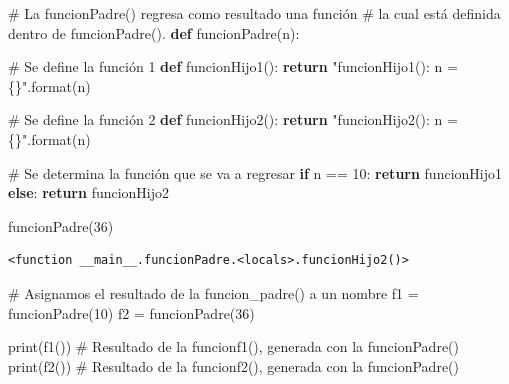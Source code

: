 \documentclass[
  spanish,
  letterpaper,
]{scrbook}
\newenvironment{Shaded}{\begin{snugshade}}{\end{snugshade}}
\newcommand{\BuiltInTok}[1]{\textcolor[rgb]{0.00,0.23,0.31}{#1}}
\newcommand{\CommentTok}[1]{\textcolor[rgb]{0.37,0.37,0.37}{#1}}
\newcommand{\ControlFlowTok}[1]{\textcolor[rgb]{0.00,0.23,0.31}{\textbf{#1}}}
\newcommand{\DecValTok}[1]{\textcolor[rgb]{0.68,0.00,0.00}{#1}}
\newcommand{\KeywordTok}[1]{\textcolor[rgb]{0.00,0.23,0.31}{\textbf{#1}}}
\newcommand{\NormalTok}[1]{\textcolor[rgb]{0.00,0.23,0.31}{#1}}
\newcommand{\OperatorTok}[1]{\textcolor[rgb]{0.37,0.37,0.37}{#1}}
\newcommand{\SpecialCharTok}[1]{\textcolor[rgb]{0.37,0.37,0.37}{#1}}
\newcommand{\StringTok}[1]{\textcolor[rgb]{0.13,0.47,0.30}{#1}}
\theoremstyle{definition}
\theoremstyle{remark}
\begin{document}
\begin{Shaded}
\begin{Highlighting}[]
\CommentTok{\# La funcionPadre() regresa como resultado una función }
\CommentTok{\# la cual está definida dentro de funcionPadre().}
\KeywordTok{def}\NormalTok{ funcionPadre(n):}

    \CommentTok{\# Se define la función 1}
    \KeywordTok{def}\NormalTok{ funcionHijo1():}
        \ControlFlowTok{return} \StringTok{"funcionHijo1(): n = }\SpecialCharTok{\{\}}\StringTok{"}\NormalTok{.}\BuiltInTok{format}\NormalTok{(n)}

    \CommentTok{\# Se define la función 2}
    \KeywordTok{def}\NormalTok{ funcionHijo2():}
        \ControlFlowTok{return} \StringTok{"funcionHijo2(): n = }\SpecialCharTok{\{\}}\StringTok{"}\NormalTok{.}\BuiltInTok{format}\NormalTok{(n)}

    \CommentTok{\# Se determina la función que se va a regresar}
    \ControlFlowTok{if}\NormalTok{ n }\OperatorTok{==} \DecValTok{10}\NormalTok{:}
        \ControlFlowTok{return}\NormalTok{ funcionHijo1}
    \ControlFlowTok{else}\NormalTok{:}
        \ControlFlowTok{return}\NormalTok{ funcionHijo2}
\end{Highlighting}
\end{Shaded}

\begin{Shaded}
\begin{Highlighting}[]
\NormalTok{funcionPadre(}\DecValTok{36}\NormalTok{)}
\end{Highlighting}
\end{Shaded}

\begin{verbatim}
<function __main__.funcionPadre.<locals>.funcionHijo2()>
\end{verbatim}

\begin{Shaded}
\begin{Highlighting}[]
\CommentTok{\# Asignamos el resultado de la funcion\_padre() a un nombre}
\NormalTok{f1 }\OperatorTok{=}\NormalTok{ funcionPadre(}\DecValTok{10}\NormalTok{)}
\NormalTok{f2 }\OperatorTok{=}\NormalTok{ funcionPadre(}\DecValTok{36}\NormalTok{)}
\end{Highlighting}
\end{Shaded}

\begin{Shaded}
\begin{Highlighting}[]
\BuiltInTok{print}\NormalTok{(f1()) }\CommentTok{\# Resultado de la funcionf1(), generada con la funcionPadre()}
\BuiltInTok{print}\NormalTok{(f2()) }\CommentTok{\# Resultado de la funcionf2(), generada con la funcionPadre()}
\end{Highlighting}
\end{Shaded}
\end{document}
